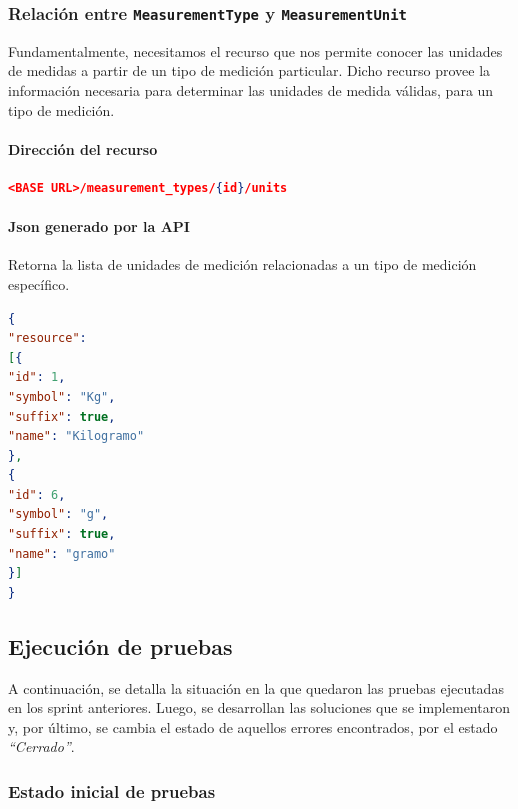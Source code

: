 \subsubsection{Relación entre \texttt{MeasurementType} y \texttt{MeasurementUnit}}

Fundamentalmente, necesitamos el recurso que nos permite conocer las unidades de medidas a partir de un tipo de medición particular.
Dicho recurso provee la información necesaria para determinar las unidades de medida válidas, para un tipo de medición.

\paragraph{Dirección del recurso}
\begin{lstlisting}[language=json,firstnumber=1]
<BASE URL>/measurement_types/{id}/units
\end{lstlisting}

\paragraph{Json generado por la API} 

Retorna la lista de unidades de medición relacionadas a un tipo de medición específico.

\begin{lstlisting}[language=json, caption=Json generado por la api, label=unitPeso]
{
"resource": 
[{
"id": 1,
"symbol": "Kg",
"suffix": true,
"name": "Kilogramo"
},
{
"id": 6,
"symbol": "g",
"suffix": true,
"name": "gramo"
}]
}
\end{lstlisting}


\subsection{Ejecución de pruebas}

A continuación, se detalla la situación en la que quedaron las pruebas ejecutadas en los sprint anteriores.
Luego, se desarrollan las soluciones que se implementaron y, por último, se cambia el estado de aquellos errores encontrados, por el estado \textit{``Cerrado''}.

\subsubsection{Estado inicial de pruebas}

